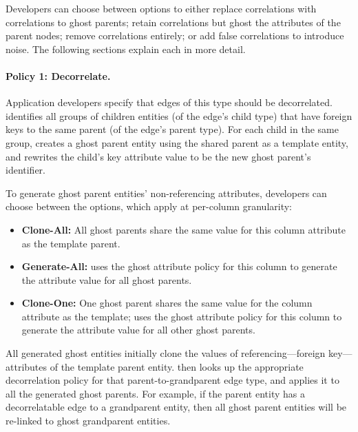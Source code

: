 Developers can choose between options to either replace correlations with correlations 
to ghost parents; retain correlations but ghost the attributes of the parent nodes; remove
correlations entirely; or add false correlations to introduce noise. 
The following sections explain each in more detail.

\paragraph{Policy 1: Decorrelate.}
Application developers specify that edges of this type should be decorrelated. \sys identifies all groups of
children entities (of the edge's child type) that have foreign keys to the same parent (of the
edge's parent type). For each child in the same group, \sys creates a ghost parent entity using
the shared parent as a template entity, and
rewrites the child's key attribute value to be the new ghost parent's identifier. 

To generate ghost parent entities' non-referencing attributes, developers can choose between the options, which apply at per-column
granularity:
\begin{itemize}
    \item \textbf{Clone-All:} All ghost parents share the same value for this column attribute as the
        template parent.
    \item \textbf{Generate-All:} \sys uses the ghost attribute policy for this column to
        generate the attribute value for all ghost parents.
    \item \textbf{Clone-One:} One ghost parent shares the same value for the column attribute as the
        template; \sys uses the ghost attribute policy for this column to
        generate the attribute value for all other ghost parents.
\end{itemize}

All generated ghost entities initially clone the values of referencing---foreign key---attributes of the template parent entity. 
\sys then looks up the appropriate decorrelation policy for that parent-to-grandparent edge type, and applies it to all the generated
ghost parents. For example, if the parent entity has a decorrelatable edge to a grandparent entity,
then all ghost parent entities will be re-linked to ghost grandparent entities.


